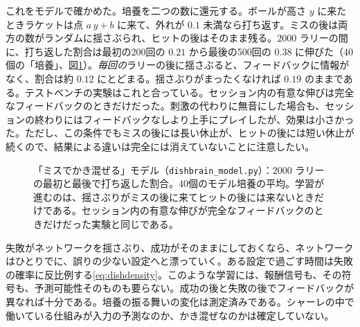 これをモデルで確かめた。培養を二つの数に還元する。ボールが高さ $y$ に来たときラケットは点 $a\,y+b$ に来て、外れが $0.1$ 未満なら打ち返す。ミスの後は両方の数がランダムに揺さぶられ、ヒットの後はそのまま残る。$2000$ ラリーの間に、打ち返した割合は最初の200回の $0.21$ から最後の500回の $0.38$ に伸びた（40個の「培養」、図\ref{fig:dishmodel}）。\emph{毎回の}ラリーの後に揺さぶると、フィードバックに情報がなく、割合は約 $0.12$ にとどまる。揺さぶりがまったくなければ $0.19$ のままである。テストベンチの実験はこれと合っている。セッション内の有意な伸びは完全なフィードバックのときだけだった。刺激の代わりに無音にした場合も、セッションの終わりにはフィードバックなしより上手にプレイしたが、効果は小さかった\cite{Kagan2022}。ただし、この条件でもミスの後には長い休止が、ヒットの後には短い休止が続くので、結果による違いは完全には消えていないことに注意したい。

\begin{figure}[t]
\centering
{}
\caption{「ミスでかき混ぜる」モデル（\texttt{dishbrain\_model.py}）：$2000$ ラリーの最初と最後で打ち返した割合。40個のモデル培養の平均。学習が進むのは、揺さぶりがミスの後に来てヒットの後には来ないときだけである。セッション内の有意な伸びが完全なフィードバックのときだけだった実験と同じである。}
\label{fig:dishmodel}
\end{figure}

\begin{keyblock}
\begin{proposition}[かき混ぜる教師]
\label{prop:dishscramble}
失敗がネットワークを揺さぶり、成功がそのままにしておくなら、ネットワークはひとりでに、誤りの少ない設定へと漂っていく。ある設定で過ごす時間は失敗の確率に反比例する\eqref{eq:dishdensity}。このような学習には、報酬信号も、その符号も、予測可能性そのものも要らない。成功の後と失敗の後でフィードバックが異なれば十分である。培養の振る舞いの変化は測定済みである。シャーレの中で働いている仕組みが入力の予測なのか、かき混ぜなのかは確定していない。
\end{proposition}
\end{keyblock}

